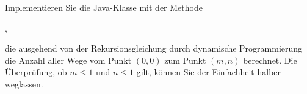 \documentclass{lehramt-informatik-aufgabe}
\begin{document}
\noindent
Implementieren Sie die Java-Klasse  mit der Methode

\begin{center}
,
\end{center}

\noindent
die ausgehend von der Rekursionsgleichung durch dynamische
Programmierung die Anzahl aller Wege vom Punkt $(0, 0)$ zum Punkt $(m,
n)$ berechnet.
Die Überprüfung, ob $m \leq 1$ und $n \leq 1$ gilt, können Sie der
Einfachheit halber weglassen.

\begin{liAntwort}
\end{liAntwort}
\end{document}
